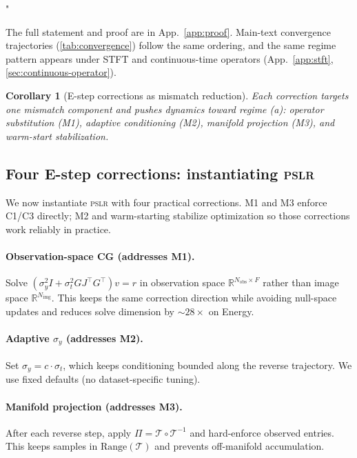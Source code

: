 "\documentclass{article}
\theoremstyle{plain}
\newtheorem{corollary}[theorem]{Corollary}
\theoremstyle{definition}
\theoremstyle{remark}
\newcommand{\tsimg}{\mathcal{T}}
\newcommand{\imgts}{\mathcal{T}^{-1}}
\newcommand{\pslr}{\textsc{pslr}}
\newcommand{\Nimg}{N_{\mathrm{img}}}
\newcommand{\Nobs}{N_{\mathrm{obs}}}
\begin{document}
The full statement and proof are in App.~\ref{app:proof}. Main-text convergence trajectories (\cref{tab:convergence}) follow the same ordering, and the same regime pattern appears under STFT and continuous-time operators (App.~\ref{app:stft}, \ref{sec:continuous-operator}).

\begin{corollary}[E-step corrections as mismatch reduction]
\label{cor:corrections}
Each correction targets one mismatch component and pushes dynamics toward regime (a): operator substitution (M1), adaptive conditioning (M2), manifold projection (M3), and warm-start stabilization.
\end{corollary}

\vspace{-1mm}
\subsection{Four E-step corrections: instantiating \pslr{}}
\label{subsec:corrections}
\vspace{-1mm}

We now instantiate \pslr{} with four practical corrections. M1 and M3 enforce C1/C3 directly; M2 and warm-starting stabilize optimization so those corrections work reliably in practice.

\paragraph{Observation-space CG (addresses M1).}
\label{subsec:obs-cg}
Solve $(\sigma_y^2 I + \sigma_t^2 G J^\top G^\top) v = r$ in observation space $\mathbb{R}^{\Nobs \times F}$ rather than image space $\mathbb{R}^{\Nimg}$. This keeps the same correction direction while avoiding null-space updates and reduces solve dimension by $\sim 28\times$ on Energy.

\paragraph{Adaptive $\sigma_y$ (addresses M2).}
Set $\sigma_y = c \cdot \sigma_t$, which keeps conditioning bounded along the reverse trajectory. We use fixed defaults (no dataset-specific tuning).

\paragraph{Manifold projection (addresses M3).}
After each reverse step, apply $\Pi=\tsimg\circ\imgts$ and hard-enforce observed entries. This keeps samples in $\mathrm{Range}(\tsimg)$ and prevents off-manifold accumulation.
\end{document}
